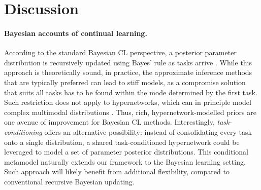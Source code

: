 \documentclass{article}
\begin{document}
\section{Discussion}

\vspace{-2mm}
\paragraph{Bayesian accounts of continual learning.} According to the standard Bayesian CL perspective, a posterior parameter distribution is recursively updated using Bayes' rule as tasks arrive \mbox{\citep{kirkpatrick_overcoming_2017, huszar_note_2018, nguyen_variational_2017}}. While this approach is theoretically sound, in practice, the approximate inference methods that are typically preferred can lead to stiff models, as a compromise solution that suits all tasks has to be found within the mode determined by the first task. Such restriction does not apply to hypernetworks, which can in principle model complex multimodal distributions \citep[][]{louizos_multiplicative_2017, pawlowski_implicit_2017, henning2018approximating}. Thus, rich, hypernetwork-modelled priors are one avenue of improvement for Bayesian CL methods. Interestingly, \emph{task-conditioning} offers an alternative possibility: instead of consolidating every task onto a single distribution, a shared task-conditioned hypernetwork could be leveraged to model a set of parameter posterior distributions. This conditional metamodel naturally extends our framework to the Bayesian learning setting. Such approach will likely benefit from additional flexibility, compared to conventional recursive Bayesian updating.


\vspace{-2mm}
\end{document}
